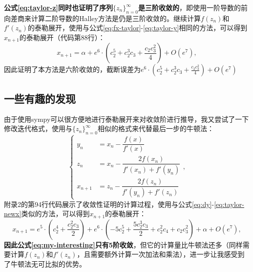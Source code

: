 \textbf{公式\ref{eq:taylor-z}同时也证明了序列$\{z_n\}_{n=0}^\infty$是三阶收敛的}，即使用一阶导数的前向差商来计算二阶导数的Halley方法是仍是三阶收敛的。继续计算$f(z_n)$和$f'(z_n)$的泰勒展开，使用与公式\ref{eq:fx-taylor}-\ref{eq:taylor-y}相同的方法，可以得到$x_{n+1}$的泰勒展开（代码第88行）：
\begin{equation}
    \label{eq:taylor-newx}
    x_{n+1} = \alpha + e^{6} \cdot \left(c_{2}^{5} + c_{2}^{3} c_{3} + \frac{c_{2} c_{3}^{2}}{4}\right) + O\left(e^{7}\right),
\end{equation}
因此证明了本方法是六阶收敛的，截断误差为$e^{6} \cdot \left(c_{2}^{5} + c_{2}^{3} c_{3} + \frac{c_{2} c_{3}^{2}}{4}\right) + O\left(e^{7}\right)$


\subsection{一些有趣的发现}

由于使用sympy可以很方便地进行泰勒展开来对收敛阶进行推导，我又尝试了一下修改迭代格式，使用与$\{z_n\}_{n=0}^\infty$相似的格式来代替最后一步的牛顿法：
\begin{equation}
    \label{eq:my-interesting}
    \begin{cases}
        y_n &= x_n - \dfrac{f(x)}{f'(x)} \\
        z_n &= x_n - \dfrac{2f(x_n)}{f'(x_n) + f'(y_n)} \\
        x_{n+1} &= z_n - \dfrac{2f(z_n)}{f'(y_n) + f'(z_n)}
    \end{cases},
\end{equation}
附录2的第94行代码展示了收敛性证明的计算过程，使用与公式\ref{eq:dy}-\ref{eq:taylor-newx}类似的方法，可以得到$x_{n+1}$的泰勒展开：
\begin{equation}
    x_{n+1} = e^{5} \cdot \left(c_{2}^{4} + \frac{c_{2}^{2} c_{3}}{2}\right) + e^{6} \cdot \left(- 5 c_{2}^{5} + \frac{5 c_{2}^{3} c_{3}}{2} + c_{2}^{2} c_{4} + c_{2} c_{3}^{2}\right) + \alpha + O\left(e^{7}\right),
\end{equation}
\textbf{因此公式\ref{eq:my-interesting}只有5阶收敛}，但它的计算量比牛顿法还多（同样需要计算$f(z_n)$和$f'(z_n)$，且需要额外计算一次加法和乘法），进一步让我感受到了牛顿法无可比拟的优势。





